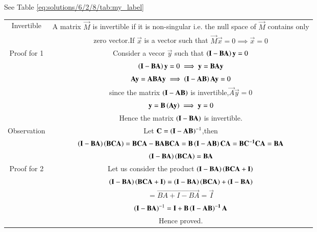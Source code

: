 See Table     \ref{eq:solutions/6/2/8/tab:my_label}

\begin{table*}[h]
    \centering
    \begin{tabular}{|c|c|}
         \hline
         Invertible & A matrix $\vec{M}$ is invertible if it is non-singular i.e. the null space of $\vec{M}$ contains only \\
         & zero vector.If $\vec{x}$ is a vector such that $\vec{M}\vec{x}=0\implies \vec{x}=0$\\
         \hline
         Proof for 1 & Consider a vecor $\vec{y}$ such that $\left(\mathbf{I}-\mathbf{B}\mathbf{A}\right)\mathbf{y}=0$\\
         & $\left(\mathbf{I}-\mathbf{B}\mathbf{A}\right)\mathbf{y}=0\implies\mathbf{y}=\mathbf{BA}\mathbf{y}$\\
         & $\mathbf{A}\mathbf{y}=\mathbf{ABA}\mathbf{y}\implies\left(\mathbf{I}-\mathbf{A}\mathbf{B}\right)\mathbf{A}\mathbf{y}=0$\\
         & since the matrix $\left(\mathbf{I}-\mathbf{A}\mathbf{B}\right)$ is invertible,$\vec{A}\vec{y}=0$\\
         & $\mathbf{y}=\mathbf{B}\left(\mathbf{Ay}\right)\implies\mathbf{y}=0$\\
         & Hence the matrix $\left(\mathbf{I}-\mathbf{B}\mathbf{A}\right)$ is invertible.\\
         \hline
         Observation & Let $\mathbf{C}=\left(\mathbf{I}-\mathbf{AB}\right)^{-1}$,then\\
         & $\left(\mathbf{I}-\mathbf{BA}\right)\left(\mathbf{BCA}\right)=\mathbf{BCA}-\mathbf{BABCA}=\mathbf{B}\left(\mathbf{I}-\mathbf{AB}\right)\mathbf{CA}=\mathbf{BC^{-1}CA}=\mathbf{BA}$\\
         & $\mathbf{\left(\mathbf{I}-\mathbf{BA}\right)\left(\mathbf{BCA}\right)=\mathbf{BA}}$\\
         \hline
         Proof for 2 & Let us consider the product $\mathbf{\left(I-BA\right)\left(BCA+I\right)}$\\
         & $\mathbf{\left(I-BA\right)\left(BCA+I\right)}=\mathbf{\left(\mathbf{I}-\mathbf{BA}\right)\left(\mathbf{BCA}\right)}+\left(\mathbf{I-BA}\right)$\\
         & $=\vec{BA+I-BA}=\vec{I}$\\
         & $\left(\mathbf{I-BA}\right)^{-1}=\mathbf{I+B\left(I-AB\right)^{-1}A}$\\
         & Hence proved.\\
         \hline
    \end{tabular}
    \caption{Proof}
    \label{eq:solutions/6/2/8/tab:my_label}
\end{table*}
